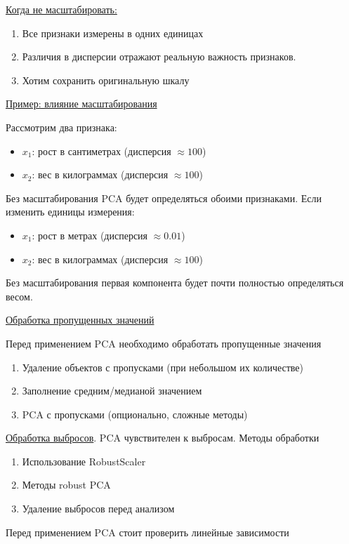 \underline{Когда не масштабировать:}
\begin{enumerate}
    \item Все признаки измерены в одних единицах
    \item Различия в дисперсии отражают реальную важность признаков.
    \item Хотим сохранить оригинальную шкалу
\end{enumerate}

\underline{Пример: влияние масштабирования}

Рассмотрим два признака:
\begin{itemize}
    \item $x_1$: рост в сантиметрах (дисперсия $\approx 100$)
    \item $x_2$: вес в килограммах (дисперсия $\approx 100$)
\end{itemize}

Без масштабирования PCA будет определяться обоими признаками.
Если изменить единицы измерения:
\begin{itemize}
    \item $x_1$: рост в метрах (дисперсия $\approx 0.01$)
    \item $x_2$: вес в килограммах (дисперсия $\approx 100$)
\end{itemize}

Без масштабирования первая компонента будет почти полностью определяться весом.

\underline{Обработка пропущенных значений}

Перед применением PCA необходимо обработать пропущенные значения
\begin{enumerate}
    \item Удаление объектов с пропусками (при небольшом их количестве)
    \item Заполнение средним/медианой значением
    \item PCA с пропусками (опционально, сложные методы)
\end{enumerate}

\underline{Обработка выбросов}.
PCA чувствителен к выбросам.
Методы обработки
\begin{enumerate}
    \item Использование RobustScaler
    \item Методы robust PCA
    \item Удаление выбросов перед анализом
\end{enumerate}

Перед применением PCA стоит проверить линейные зависимости

